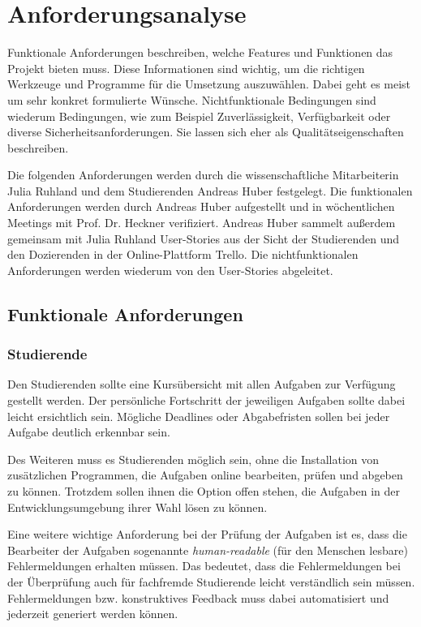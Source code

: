 \section{Anforderungsanalyse}\label{anforderungsanalyse}
Funktionale Anforderungen beschreiben, welche Features und Funktionen das
Projekt bieten muss. Diese Informationen sind wichtig, um die richtigen
Werkzeuge und Programme für die Umsetzung auszuwählen. Dabei geht es meist um
sehr konkret formulierte Wünsche. Nichtfunktionale Bedingungen sind wiederum
Bedingungen, wie zum Beispiel Zuverlässigkeit, Verfügbarkeit oder diverse
Sicherheitsanforderungen. Sie lassen sich eher als Qualitätseigenschaften
beschreiben.

Die folgenden Anforderungen werden durch die wissenschaftliche Mitarbeiterin
Julia Ruhland und dem Studierenden Andreas Huber festgelegt. Die funktionalen
Anforderungen werden durch Andreas Huber aufgestellt und in wöchentlichen
Meetings mit Prof. Dr. Heckner verifiziert. Andreas Huber sammelt außerdem
gemeinsam mit Julia Ruhland User-Stories aus der Sicht der Studierenden und den
Dozierenden in der Online-Plattform Trello. Die nichtfunktionalen Anforderungen
werden wiederum von den User-Stories abgeleitet. %

\subsection{Funktionale Anforderungen}\label{anforderungsanalyse-funktional}
\subsubsection{Studierende}\label{anforderungsanalyse-funktional-stud}
Den Studierenden sollte eine Kursübersicht mit allen Aufgaben zur Verfügung
gestellt werden. Der persönliche Fortschritt der jeweiligen Aufgaben sollte
dabei leicht ersichtlich sein. Mögliche Deadlines oder Abgabefristen sollen bei
jeder Aufgabe deutlich erkennbar sein.

Des Weiteren muss es Studierenden möglich sein, ohne die Installation von
zusätzlichen Programmen, die Aufgaben online bearbeiten, prüfen und abgeben zu
können. Trotzdem sollen ihnen die Option offen stehen, die Aufgaben in der
Entwicklungsumgebung ihrer Wahl lösen zu können.

Eine weitere wichtige Anforderung bei der Prüfung der Aufgaben ist es, dass
die Bearbeiter der Aufgaben sogenannte \emph{human-readable} (für den Menschen
lesbare) Fehlermeldungen erhalten müssen. Das bedeutet, dass die Fehlermeldungen
bei der Überprüfung auch für fachfremde Studierende leicht verständlich sein
müssen. Fehlermeldungen bzw. konstruktives Feedback muss dabei automatisiert und
jederzeit generiert werden können.

